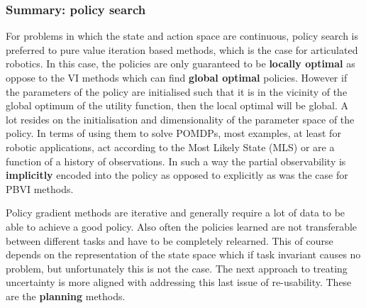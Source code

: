 \subsubsection{Summary: policy search}

For problems in which the state and action space are continuous, policy search is preferred to pure value iteration based methods, 
which is the case for articulated robotics. In this case, the policies are only guaranteed to be \textbf{locally optimal} as oppose 
to the VI methods which can find \textbf{global optimal} policies. However if the parameters of the policy are initialised 
such that it is in the vicinity of the global optimum of the utility function, then the local optimal will be global. 
A lot resides on the initialisation and dimensionality of the parameter space of the policy. 
In terms of using them to solve POMDPs, most examples, at least for robotic applications, act according to the Most Likely State (MLS) or 
are a function of a history of observations. In such a way the partial observability is \textbf{implicitly} encoded into the policy as 
opposed to explicitly as was the case for PBVI methods. 

Policy gradient methods are iterative and generally require a lot of data to be able to achieve a good policy. Also 
often the policies learned are not transferable between different tasks and have to be completely 
relearned. This of course depends on the representation of the state space which if task invariant causes no problem,
but unfortunately this is not the case. The next approach to treating uncertainty is more aligned with addressing this last issue 
of re-usability. These are the \textbf{planning} methods.



